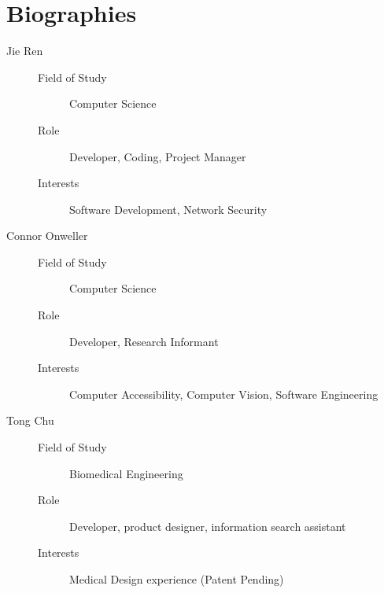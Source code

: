 \documentclass[acmsmall, nonacm]{acmart}
\begin{document}
\section{Biographies}


\begin{description}
\item[Jie Ren] \hfill
  \begin{description}
    \item[Field of Study] Computer Science
    \item[Role] Developer, Coding, Project Manager
    \item[Interests] Software Development, Network Security
  \end{description}
\item[Connor Onweller] \hfill
  \begin{description}
    \item[Field of Study] Computer Science
    \item[Role] Developer, Research Informant
    \item[Interests] Computer Accessibility, Computer Vision, Software Engineering
  \end{description}
\item[Tong Chu] \hfill
  \begin{description}
    \item[Field of Study] Biomedical Engineering
    \item[Role] Developer, product designer, information search assistant 
    \item[Interests] Medical Design experience (Patent Pending)
  \end{description}
\end{description}




\end{document}
